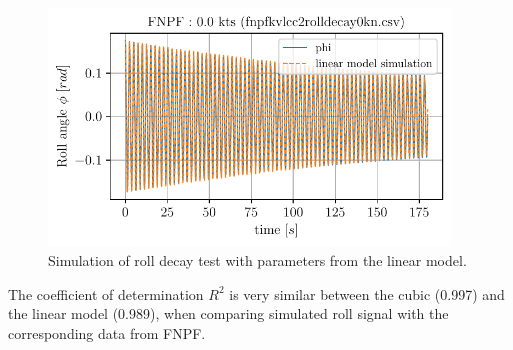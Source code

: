 \begin{figure}[H]
\begin{center}\includegraphics[width = 0.95\textwidth]{figures/sim_linear.pdf}\end{center}
\vspace{-0.7cm}
\caption{Simulation of roll decay test with parameters from the linear model.}
\label{fig:sim_linear}
\end{figure}
The coefficient of determination $R^2$ is very similar between the
cubic (0.997) and the linear model (0.989), when comparing simulated
roll signal with the corresponding data from FNPF.
